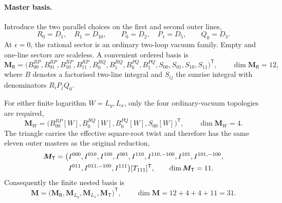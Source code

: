 \documentclass[11pt]{article}
\newcommand{\T}{\mathsf T}
\newcommand{\R}{\mathsf R}
\begin{document}
\paragraph{Master basis.}
Introduce the two parallel choices on the first and second outer lines,
\begin{equation}
 R_0=D_1,\quad R_1=D_{10},\qquad
 P_0=D_2,\quad P_1=D_5,\qquad Q_0=D_3.
\end{equation}
At $\epsilon=0$, the rational sector is an ordinary two-loop vacuum
family.  Empty and one-line sectors are scaleless.  A convenient ordered
basis is
\begin{equation}
 \bm M_{\R}=
 \bigl(
 B^{RP}_{00},B^{RP}_{01},B^{RP}_{10},B^{RP}_{11},
 B^{RQ}_{0},B^{RQ}_{1},B^{PQ}_{0},B^{PQ}_{1},
 S_{00},S_{01},S_{10},S_{11}
 \bigr)^{\mathsf T},
 \qquad \dim\bm M_{\R}=12,
\end{equation}
where $B$ denotes a factorised two-line integral and
$S_{ij}$ the sunrise integral with denominators $R_iP_jQ_0$.

For either finite logarithm $W=L_y,L_x$, only the four ordinary-vacuum
topologies are required,
\begin{equation}
 \bm M_W=
 \bigl(B^{RP}_{00}[W],B^{RQ}_{0}[W],B^{PQ}_{0}[W],S_{00}[W]\bigr)^{\mathsf T},
 \qquad \dim\bm M_W=4.
\end{equation}
The triangle carries the effective square-root twist and therefore has
the same eleven outer masters as the original reduction,
\begin{align}
 \bm M_{\T}=\bigl(&I^{000},I^{010},I^{100},I^{001},
 I^{110},I^{110,-100},I^{101},I^{101,-100},\notag\\
 &I^{011},I^{011,-100},I^{111}\bigr)[T_{111}]^{\mathsf T},
 \qquad \dim\bm M_{\T}=11.
\end{align}
Consequently the finite nested basis is
\begin{equation}
 \bm M=
 \bigl(\bm M_{\R},\bm M_{L_y},\bm M_{L_x},\bm M_{\T}\bigr)^{\mathsf T},
 \qquad \dim\bm M=12+4+4+11=31.
\end{equation}
\end{document}
